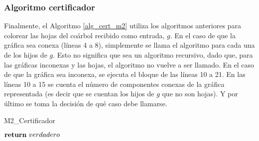 \subsubsection{Algoritmo certificador}

Finalmente, el Algoritmo \ref{alg_cert_m2} utiliza los algoritmos anteriores para colorear las hojas del coárbol recibido como entrada, $g$. En el caso de que la gráfica sea conexa (líneas 4 a 8), simplemente se llama el algoritmo para cada una de los hijos de $g$. Esto no significa que sea un algoritmo recursivo, dado que, para las gráficas inconexas y las hojas, el algoritmo no vuelve a ser llamado. En el caso de que la gráfica sea inconexa, se ejecuta el bloque de las líneas 10 a 21. En las líneas 10 a 15 se cuenta el número de componentes conexas de la gráfica representada (es decir que se cuentan los hijos de $g$ que no son hojas). Y por último se toma la decisión de qué caso debe llamarse.


\begin{algorithm}[!htbp]
\caption{M2\_Certificador}
\label{alg_cert_m2}

\DontPrintSemicolon %



$\Return\ verdadero$\;

\end{algorithm}
